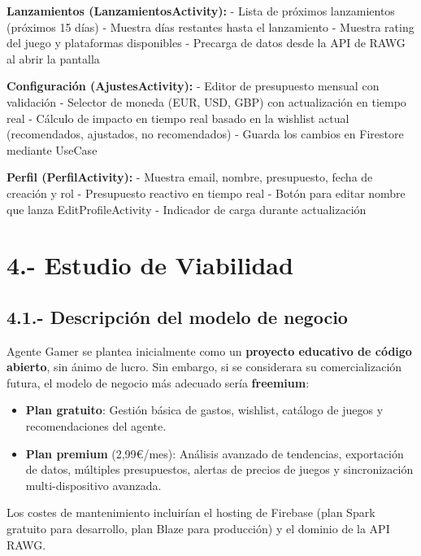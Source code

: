\documentclass[
  spanish,
  11pt,
  paper=a4,
  ,captions=tableheading
]{scrartcl}
\providecommand{\tightlist}{%
  \setlength{\itemsep}{0pt}\setlength{\parskip}{0pt}}
\begin{document}
\textbf{Lanzamientos (LanzamientosActivity):} - Lista de próximos
lanzamientos (próximos 15 días) - Muestra días restantes hasta el
lanzamiento - Muestra rating del juego y plataformas disponibles -
Precarga de datos desde la API de RAWG al abrir la pantalla

\textbf{Configuración (AjustesActivity):} - Editor de presupuesto
mensual con validación - Selector de moneda (EUR, USD, GBP) con
actualización en tiempo real - Cálculo de impacto en tiempo real basado
en la wishlist actual (recomendados, ajustados, no recomendados) -
Guarda los cambios en Firestore mediante UseCase

\textbf{Perfil (PerfilActivity):} - Muestra email, nombre, presupuesto,
fecha de creación y rol - Presupuesto reactivo en tiempo real - Botón
para editar nombre que lanza EditProfileActivity - Indicador de carga
durante actualización

\newpage

\hypertarget{estudio-de-viabilidad}{%
\section{4.- Estudio de Viabilidad}\label{estudio-de-viabilidad}}

\hypertarget{descripciuxf3n-del-modelo-de-negocio}{%
\subsection{4.1.- Descripción del modelo de
negocio}\label{descripciuxf3n-del-modelo-de-negocio}}

Agente Gamer se plantea inicialmente como un \textbf{proyecto educativo
de código abierto}, sin ánimo de lucro. Sin embargo, si se considerara
su comercialización futura, el modelo de negocio más adecuado sería
\textbf{freemium}:

\begin{itemize}
\tightlist
\item
  \textbf{Plan gratuito}: Gestión básica de gastos, wishlist, catálogo
  de juegos y recomendaciones del agente.
\item
  \textbf{Plan premium} (2,99€/mes): Análisis avanzado de tendencias,
  exportación de datos, múltiples presupuestos, alertas de precios de
  juegos y sincronización multi-dispositivo avanzada.
\end{itemize}

Los costes de mantenimiento incluirían el hosting de Firebase (plan
Spark gratuito para desarrollo, plan Blaze para producción) y el dominio
de la API RAWG.
\end{document}
